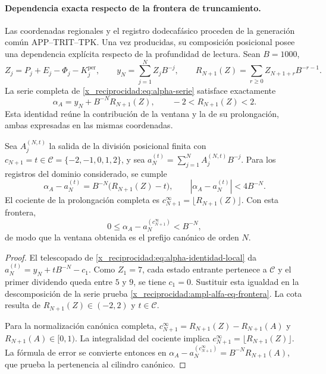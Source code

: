 

\paragraph{Dependencia exacta respecto de la frontera de truncamiento.}
\label{x_reciprocidad:ampl-alfa-frontera-exacta}
Las coordenadas regionales y el registro dodecafásico proceden de la
generación común APP--TRIT--TPK. Una vez producidas, su composición
posicional posee una dependencia explícita respecto de la profundidad
de lectura. Sean $B=1000$,
\[
 Z_j=P_j+E_j-\Phi_j-K_j^{\mathrm{per}},\qquad
 y_N=\sum_{j=1}^{N}Z_jB^{-j},\qquad
 R_{N+1}(Z)=\sum_{r\geq0}Z_{N+1+r}B^{-r-1}.
\]
La serie completa de \eqref{x_reciprocidad:eq:alpha-serie} satisface exactamente
\[
 \alpha_A=y_N+B^{-N}R_{N+1}(Z),\qquad
 -2<R_{N+1}(Z)<2.
\]
Esta identidad reúne la contribución de la ventana y la de su
prolongación, ambas expresadas en las mismas coordenadas.

\begin{proposition}
\label{x_reciprocidad:ampl-alfa-prop-frontera}
Sea $A_j^{(N,t)}$ la salida de la división posicional finita con
$c_{N+1}=t\in\mathcal C=\{-2,-1,0,1,2\}$, y sea
$a_N^{(t)}=\sum_{j=1}^{N}A_j^{(N,t)}B^{-j}$. Para los registros del
dominio considerado, se cumple
\begin{equation}
 \alpha_A-a_N^{(t)}
 =B^{-N}\bigl(R_{N+1}(Z)-t\bigr),
 \qquad
 |\alpha_A-a_N^{(t)}|<4B^{-N}.
 \label{x_reciprocidad:ampl-alfa-eq-frontera}
\end{equation}
El cociente de la prolongación completa es
$c_{N+1}^{\infty}=\lfloor R_{N+1}(Z)\rfloor$. Con esta frontera,
\[
 0\leq\alpha_A-a_N^{(c_{N+1}^{\infty})}<B^{-N},
\]
de modo que la ventana obtenida es el prefijo canónico de orden $N$.
\end{proposition}
\begin{proof}
El telescopado de \eqref{x_reciprocidad:eq:alpha-identidad-local} da
$a_N^{(t)}=y_N+tB^{-N}-c_1$. Como $Z_1=7$, cada estado entrante
pertenece a $\mathcal C$ y el primer dividendo queda entre $5$ y $9$,
se tiene $c_1=0$. Sustituir esta igualdad en la descomposición de la
serie prueba \eqref{x_reciprocidad:ampl-alfa-eq-frontera}. La cota resulta de
$R_{N+1}(Z)\in(-2,2)$ y $t\in\mathcal C$.

Para la normalización canónica completa,
$c_{N+1}^{\infty}=R_{N+1}(Z)-R_{N+1}(A)$ y
$R_{N+1}(A)\in[0,1)$. La integralidad del cociente implica
$c_{N+1}^{\infty}=\lfloor R_{N+1}(Z)\rfloor$. La fórmula de error
se convierte entonces en
$\alpha_A-a_N^{(c_{N+1}^{\infty})}=B^{-N}R_{N+1}(A)$, que prueba
la pertenencia al cilindro canónico.
\end{proof}

